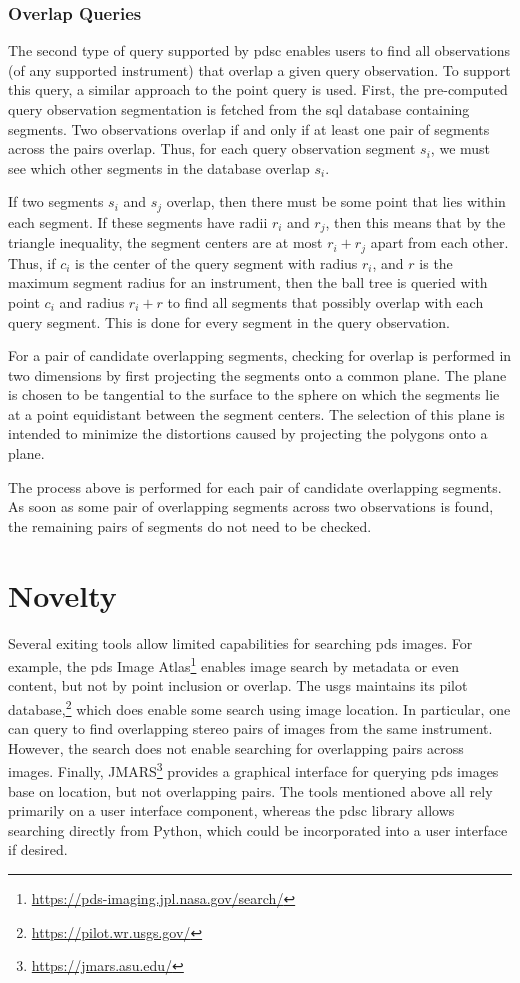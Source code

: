 \documentclass[twocolumn]{extarticle}
\begin{document}
\subsubsection*{Overlap Queries}

The second type of query supported by \ac{pdsc} enables users to find all
observations (of any supported instrument) that overlap a given query
observation. To support this query, a similar approach to the point query is
used. First, the pre-computed query observation segmentation is fetched from the
\ac{sql} database containing segments. Two observations overlap if and only if
at least one pair of segments across the pairs overlap. Thus, for each query
observation segment $s_i$, we must see which other segments in the database
overlap $s_i$.

If two segments $s_i$ and $s_j$ overlap, then there must be some point that lies
within each segment. If these segments have radii $r_i$ and $r_j$, then this
means that by the triangle inequality, the segment centers are at most $r_i +
r_j$ apart from each other. Thus, if $c_i$ is the center of the query segment
with radius $r_i$, and $r$ is the maximum segment radius for an instrument, then
the ball tree is queried with point $c_i$ and radius $r_i + r$ to find all
segments that possibly overlap with each query segment. This is done for every
segment in the query observation.

For a pair of candidate overlapping segments, checking for overlap is performed
in two dimensions by first projecting the segments onto a common plane. The
plane is chosen to be tangential to the surface to the sphere on which the
segments lie at a point equidistant between the segment centers. The selection
of this plane is intended to minimize the distortions caused by projecting the
polygons onto a plane.

The process above is performed for each pair of candidate overlapping segments.
As soon as some pair of overlapping segments across two observations is found,
the remaining pairs of segments do not need to be checked.

\section*{Novelty}

Several exiting tools allow limited capabilities for searching \ac{pds} images.
For example, the \ac{pds} Image
Atlas\footnote{\url{https://pds-imaging.jpl.nasa.gov/search/}} enables image
search by metadata or even content, but not by point inclusion or overlap. The
\ac{usgs} maintains its \ac{pilot}
database,\footnote{\url{https://pilot.wr.usgs.gov/}} which does enable some
search using image location. In particular, one can query to find overlapping
stereo pairs of images from the same instrument. However, the search does not
enable searching for overlapping pairs across images. Finally,
JMARS\footnote{\url{https://jmars.asu.edu/}} provides a graphical interface for
querying \ac{pds} images base on location, but not overlapping pairs. The tools
mentioned above all rely primarily on a user interface component, whereas the
\ac{pdsc} library allows searching directly from Python, which could be
incorporated into a user interface if desired.
\end{document}
